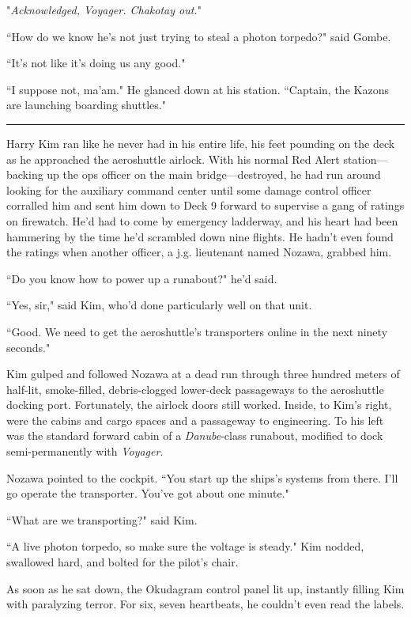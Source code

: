 \documentclass[twoside,letterpaper,12pt]{memoir}
\begin{document}
"\textit{Acknowledged, Voyager. Chakotay out.}"

``How do we know he's not just trying to steal a photon torpedo?" said Gombe.

``It's not like it's doing us any good."

``I suppose not, ma'am." He glanced down at his station. ``Captain, the Kazons are launching boarding shuttles."

\begin{center}\rule{3cm}{0.4 pt}\end{center}

Harry Kim ran like he never had in his entire life, his feet pounding on the deck as he approached the aeroshuttle airlock. With his normal Red Alert station---backing up the ops officer on the main bridge---destroyed, he had run around looking for the auxiliary command center until some damage control officer corralled him and sent him down to Deck 9 forward to supervise a gang of ratings on firewatch. He'd had to come by emergency ladderway, and his heart had been hammering by the time he'd scrambled down nine flights. He hadn't even found the ratings when another officer, a j.g. lieutenant named Nozawa, grabbed him.

``Do you know how to power up a runabout?" he'd said.

``Yes, sir," said Kim, who'd done particularly well on that unit.

``Good. We need to get the aeroshuttle's transporters online in the next ninety seconds."

Kim gulped and followed Nozawa at a dead run through three hundred meters of half-lit, smoke-filled, debris-clogged lower-deck passageways to the aeroshuttle docking port. Fortunately, the airlock doors still worked. Inside, to Kim's right, were the cabins and cargo spaces and a passageway to engineering. To his left was the standard forward cabin of a \textit{Danube}-class runabout, modified to dock semi-permanently with \textit{Voyager}.

Nozawa pointed to the cockpit. ``You start up the ships's systems from there. I'll go operate the transporter. You've got about one minute."

``What are we transporting?" said Kim.

``A live photon torpedo, so make sure the voltage is steady." Kim nodded, swallowed hard, and bolted for the pilot's chair.

As soon as he sat down, the Okudagram control panel lit up, instantly filling Kim with paralyzing terror. For six, seven heartbeats, he couldn't even read the labels.
\end{document}
